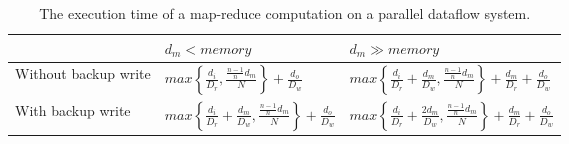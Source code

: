 {
\renewcommand{\baselinestretch}{1.0}
\begin{table*}
\centering
\renewcommand{\arraystretch}{1.2}
\begin{tabular}{|l|l|l|}
\hline
& $d_m < memory$ & $d_m \gg memory$ \\ \hline
Without backup write & $max\left\{\frac{d_i}{D_r},
\frac{\frac{n-1}{n} d_m}{N}\right\} + \frac{d_o}{D_w}$ & 
$max\left\{\frac{d_i}{D_r} + \frac{d_m}{D_w}, \frac{\frac{n-1}{n} d_m}{N}\right\} + \frac{d_m}{D_r} + \frac{d_o}{D_w}$ \\ \hline
With backup write & $max\left\{\frac{d_i}{D_r} + \frac{d_m}{D_w}, \frac{\frac{n-1}{n} d_m}{N}\right\} + \frac{d_o}{D_w}$ & $max\left\{\frac{d_i}{D_r} + \frac{2 d_m}{D_w},
\frac{\frac{n-1}{n} d_m}{N}\right\} + \frac{d_m}{D_r} + \frac{d_o}{D_w}$ \\ \hline
\end{tabular}
\caption{The execution time of a map-reduce computation on a parallel dataflow system.}
\label{table:model:simple}
\end{table*}
}

